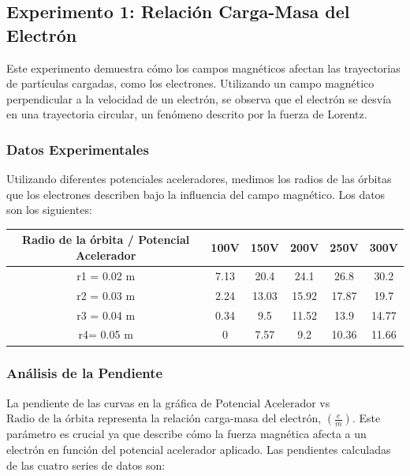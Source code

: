 \subsection{Experimento 1: Relación Carga-Masa del Electrón}
Este experimento demuestra cómo los campos magnéticos afectan las trayectorias de partículas cargadas, como los electrones. Utilizando un campo magnético perpendicular a la velocidad de un electrón, se observa que el electrón se desvía en una trayectoria circular, un fenómeno descrito por la fuerza de Lorentz.

\subsubsection{Datos Experimentales}
Utilizando diferentes potenciales aceleradores, medimos los radios de las órbitas que los electrones describen bajo la influencia del campo magnético. Los datos son los siguientes:

\begin{center}
\begin{tabular}{|c|c|c|c|c|c|}
\hline
\textbf{Radio de la órbita / Potencial Acelerador} & \textbf{100V} & \textbf{150V} & \textbf{200V} & \textbf{250V} & \textbf{300V} \\
\hline
r1 = 0.02 m & 7.13 & 20.4 & 24.1 & 26.8 & 30.2 \\
r2 = 0.03 m & 2.24 & 13.03 & 15.92 & 17.87 & 19.7 \\
r3 = 0.04 m & 0.34 & 9.5 & 11.52 & 13.9 & 14.77 \\
r4= 0.05 m & 0 & 7.57 & 9.2 & 10.36 & 11.66 \\
\hline
\end{tabular}
\end{center}

\subsubsection{Análisis de la Pendiente}
La pendiente de las curvas en la gráfica de $\text{Potencial Acelerador}$ vs $\text{Radio de la órbita}$ representa la relación carga-masa del electrón, $\left(\frac{e}{m}\right)$. Este parámetro es crucial ya que describe cómo la fuerza magnética afecta a un electrón en función del potencial acelerador aplicado. Las pendientes calculadas de las cuatro series de datos son:

